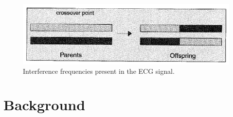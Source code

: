 \documentclass[a4paper, 11pt]{article}
\begin{document}
    \begin{figure}[h!]
        \centering
        \graphicspath{{./wiki/}}
        \includegraphics[scale=0.7]{crossover.png}
        \caption{Interference frequencies present in the ECG signal.}
        \label{Fig:crossover}
    \end{figure}

\section{Background}\label{sec:bg}
\end{document}
